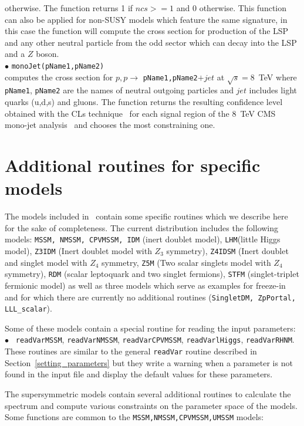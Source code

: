 \documentclass[12pt,a4paper]{article}
\begin{document}
otherwise. The function returns 1 if $ncs>=1 $ and 0 otherwise.
This function can also be applied for non-SUSY models which feature the same signature, in this case the function will compute the cross section for production of the LSP and any other neutral particle from the odd sector which can decay into the LSP and a $Z$ boson.\\[2mm]
%
\noi$\bullet$   \verb|monoJet(pName1,pName2)|\\
computes the cross section for $p,p\rightarrow$ \verb|pName1,pName2|$ +jet$ at $\sqrt{s}=8$~TeV 
where \verb|pName1|, \verb|pName2| are the names of neutral outgoing particles and $jet$ includes light quarks (u,d,s)  and gluons.
The function returns  the resulting  confidence level  obtained with the CLs technique~\cite{Read:2002hq,Read:2000ru} for each  signal region of the 8~TeV CMS mono-jet analysis~\cite{Khachatryan:2014rra} and chooses the most constraining one.



\section{Additional routines for specific models}
The models included in \micro\ contain some specific routines
which we describe here for the sake of completeness. The current 
distribution includes the following models: {\tt MSSM, NMSSM, CPVMSSM, IDM}  (inert doublet model), {\tt LHM}(little Higgs model),
  {\tt Z3IDM} (Inert doublet model with $Z_3$ symmetry), {\tt Z4IDSM} (Inert doublet and singlet model with $Z_4$ symmetry,  {\tt Z5M} (Two scalar  singlets model with $Z_4$ symmetry), {\tt RDM} (scalar leptoquark and two singlet fermions), {\tt STFM} (singlet-triplet fermionic model)  as well as three models which serve as examples for freeze-in and for which there are currently no additional routines (\verb|SingletDM, ZpPortal, LLL_scalar|).

Some of these models contain a special routine for reading the input parameters:\\
$\bullet$ \verb| readVarMSSM|, \verb|readVarNMSSM|,  \verb|readVarCPVMSSM|,
\verb|readVarlHiggs|, \verb|readVarRHNM|.\\
 These routines  are similar to the general 
\verb|readVar| routine described  in Section~\ref{setting_parameters}
but  they write a warning when a parameter is not found in the 
input file and display the default values for these parameters.

The supersymmetric models contain several additional routines to calculate the spectrum
and compute various constraints on the parameter space of the models. Some functions are
common to the \verb|MSSM,NMSSM,CPVMSSM,UMSSM| models: 
\end{document}
